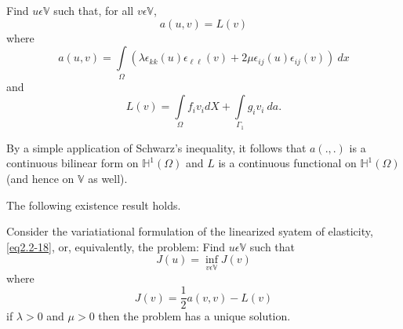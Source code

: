   
 Find $u \epsilon \mathbb{V}$ such that, for all $v \epsilon
 \mathbb{V}$, 
\begin{equation*}
a(u, v) = L(v) \tag{2.2-18}\label{eq2.2-18}
\end{equation*}
where
\begin{equation*}
a (u, v)= \int\limits_{\Omega} (\lambda\epsilon_{kk}
    (u)\epsilon_{\ell\ell}(v)+ 2\mu\epsilon_{ij} (u)
    \epsilon_{ij} (v)) ~ dx \tag{2.2-19}\label{eq2.2-19}
\end{equation*}
and
\begin{equation*}
L(v)=\int\limits_{\Omega} f_i v_i dX + \int\limits_{\Gamma_1} g_i v_i
    ~ da.\tag{2.2-20}
\end{equation*}\pageoriginale
  
 By a simple application of Schwarz's inequality, it follows that
 $a(.,.)$ is a continuous bilinear form on $\mathbb{H}^1(\Omega)$ and
 $L$ is a continuous functional on $\mathbb{H}^1(\Omega)$ (and hence on
 $\mathbb{V}$ as well). 


The following existence result holds. 
  
\begin{theorem}\label{chap2-thm2.2.3}%
Consider the variatiational formulation of the linea\-rized syatem of
elasticity, \eqref{eq2.2-18}, or, equivalently, the problem: Find $u
\epsilon \mathbb{V}$ such that 
\begin{equation*}
J(u)=\inf\limits_{v \epsilon \mathbb{V}} J(v) \tag{2.2-21}\label{eq2.2-21}
\end{equation*}
where
\begin{equation*}
J(v)=\frac{1}{2} a (v,v) - L(v)\tag{2.2-22}\label{eq2.2-22}
\end{equation*}
if $\lambda > 0$ and $\mu > 0$ then the problem has a unique solution.
\end{theorem} 
  
